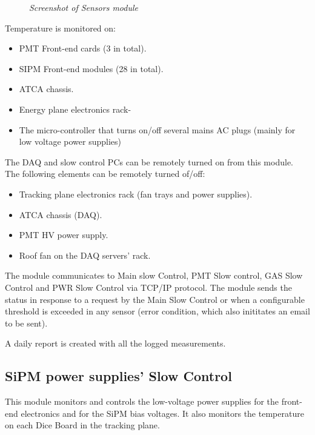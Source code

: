 \begin{figure}[ht]
    \bigskip
    \begin{center}\leavevmode
        \caption{\textit{Screenshot of Sensors module}}
        \label{fig:RIO:MAIN}
    \end{center}
\end{figure}


Temperature is monitored on:

\begin{itemize}
\item PMT Front-end cards (3 in total).
\item SIPM Front-end modules (28 in total).
\item ATCA chassis.
\item Energy plane electronics rack-
\item The micro-controller that turns on/off several mains AC plugs (mainly for low voltage power supplies)
\end{itemize}


The DAQ and slow control PCs can be remotely turned on from this module. The following elements can be remotely turned of/off:

\begin{itemize}
\item Tracking plane electronics rack (fan trays and power supplies).
\item ATCA chassis (DAQ).
\item PMT HV power supply.
\item Roof fan on the DAQ servers' rack.
\end{itemize}

The module communicates to Main slow Control, PMT Slow control, GAS Slow Control and PWR Slow Control via TCP/IP protocol. The module sends the status in response to a request by the Main Slow Control or when a configurable threshold is exceeded in any sensor (error condition, which also inititates an email to be sent).

A daily report is created with all the logged measurements. 

\subsection{SiPM power supplies' Slow Control}

This module monitors and controls the low-voltage power supplies for the front-end electronics and for the SiPM bias voltages. It also monitors the temperature on each Dice Board in the tracking plane.

